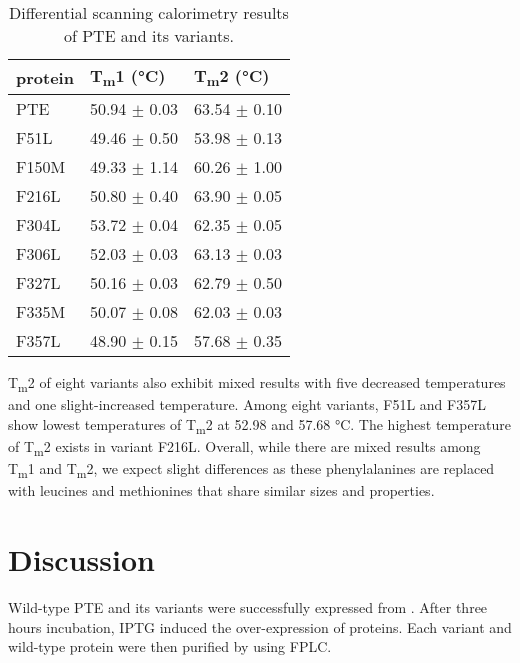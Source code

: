 \begin{refsection}
\begin{table}[h!]
    \centering
    \begin{tabular}{lll}
    \hline
    protein & T\textsubscript{m}1 (\si{\celsius}) & T\textsubscript{m}2 (\si{\celsius})\\
    \hline
    PTE    & 50.94 $\pm$ 0.03  & 63.54 $\pm$ 0.10 \\
    F51L & 49.46 $\pm$ 0.50 & 53.98 $\pm$ 0.13 \\
    F150M & 49.33 $\pm$ 1.14 & 60.26 $\pm$ 1.00\\
    F216L & 50.80 $\pm$ 0.40 & 63.90 $\pm$ 0.05 \\
    F304L & 53.72 $\pm$ 0.04 & 62.35 $\pm$ 0.05 \\
    F306L & 52.03 $\pm$ 0.03 & 63.13 $\pm$ 0.03 \\
    F327L & 50.16 $\pm$ 0.03 & 62.79 $\pm$ 0.50 \\
    F335M & 50.07 $\pm$ 0.08 & 62.03 $\pm$ 0.03 \\
    F357L & 48.90 $\pm$ 0.15 & 57.68 $\pm$ 0.35 \\

    \hline      
    \end{tabular}
    \caption[Differential scanning calorimetry results of PTE and its variants.]
    {Differential scanning calorimetry results of PTE and its variants.}
    \label{tab:dsc-chap2-result}

\end{table}

T\textsubscript{m}2 of eight variants also exhibit mixed results with five
decreased temperatures and one slight-increased temperature. Among eight
variants, F51L and F357L show lowest temperatures of T\textsubscript{m}2 at
52.98 and 57.68 \si{\celsius}. The highest temperature of T\textsubscript{m}2
exists in variant F216L. Overall, while there are mixed results among
T\textsubscript{m}1 and T\textsubscript{m}2, we expect slight differences as
these phenylalanines are replaced with leucines and methionines that share
similar sizes and properties.  

\section{Discussion}

Wild-type PTE and its variants were successfully expressed from . After three hours incubation, IPTG induced the over-expression of
proteins. Each variant and wild-type protein were then purified by using FPLC.


\end{refsection}
